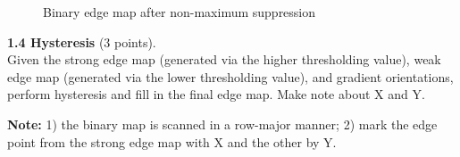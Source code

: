 \documentclass[a4paper]{article}
\begin{document}
\begin{figure}[!h]
	\centering
	\caption{Binary edge map after non-maximum suppression}
\end{figure}


\newpage
\noindent \textbf{1.4 Hysteresis} (3 points).\\
Given the strong edge map (generated via the higher thresholding value), weak edge map (generated via the lower thresholding value), and gradient orientations, perform hysteresis and fill in the final edge map. Make note about X and Y.

\noindent\textbf{Note:} 1) the binary map is scanned in a row-major manner; 2) mark the edge point from the strong edge map with X and the other by Y.
\end{document}
